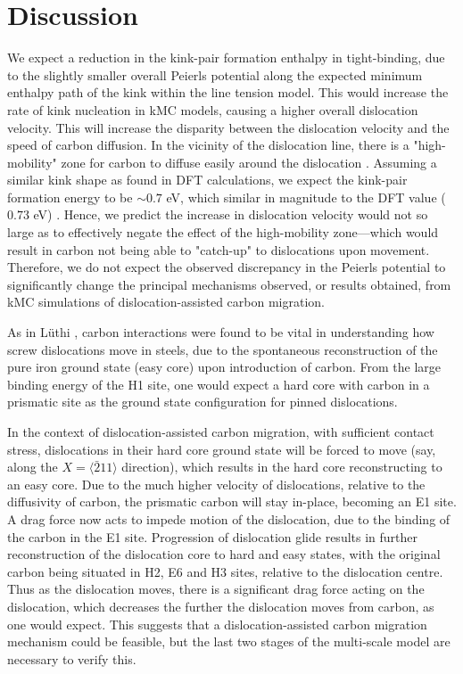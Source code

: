 \documentclass[a4paper,11pt]{article}
\begin{document}
\section{Discussion}
\label{sec:orgcc98541}
\label{sec:discussion}


We expect a reduction in the kink-pair formation enthalpy in tight-binding, due to
the slightly smaller overall Peierls potential along the expected minimum enthalpy
path of the kink within the line tension model. This would increase
the rate of kink nucleation in kMC models, causing a higher overall dislocation
velocity. This will increase the disparity between the dislocation velocity and
the speed of carbon diffusion. In the vicinity of the dislocation line, there is a
"high-mobility" zone for carbon to diffuse easily around the dislocation
\cite{Nematollahi2016}. Assuming a similar kink shape as found in DFT calculations,
we expect the kink-pair formation energy to be \(\sim 0.7\) eV, which similar in
magnitude to the DFT value (\(0.73\) eV) \cite{Itakura2012}. Hence, we predict the
increase in dislocation velocity would not so large as to effectively negate the
effect of the high-mobility zone---which would result in carbon not being able to
"catch-up" to dislocations upon movement. Therefore, we do not expect the observed
discrepancy in the Peierls potential to significantly change the principal
mechanisms observed, or results obtained, from kMC simulations of
dislocation-assisted carbon migration.



As in Lüthi \cite{Lthi2019}, carbon interactions were found to be vital in understanding how screw
dislocations move in steels, due to the spontaneous reconstruction of the pure iron ground state
(easy core) upon introduction of carbon. From the large binding energy of the H1 site, one would
expect a hard core with carbon in a prismatic site as the ground state configuration for pinned
dislocations.

In the context of dislocation-assisted carbon migration, with sufficient contact stress,
dislocations in their hard core ground state will be forced to move (say, along the \(X =
    \langle\bar{2}11\rangle\) direction), which results in the hard core reconstructing to an easy core. Due to
the much higher velocity of dislocations, relative to the diffusivity of carbon, the
prismatic carbon will stay in-place, becoming an E1 site. A drag force now acts to impede motion of the
dislocation, due to the binding of the carbon in the E1 site. Progression of dislocation glide
results in further reconstruction of the dislocation core to hard and easy states, with the
original carbon being situated in H2, E6 and H3 sites, relative to the dislocation
centre. Thus as the dislocation moves, there is a significant drag force acting on the
dislocation, which decreases the further the dislocation moves from carbon, as one would
expect. This suggests that a dislocation-assisted carbon migration mechanism could be feasible,
but the last two stages of the multi-scale model are necessary to verify this.
\end{document}
